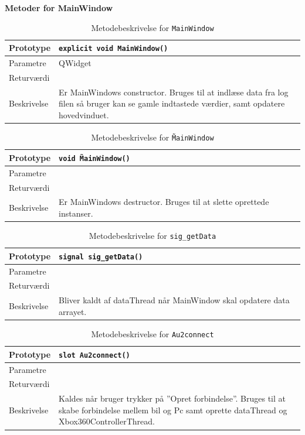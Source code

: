 \textbf{Metoder for MainWindow}

\begin{table}[H]
\begin{tabularx}{\textwidth}{| L{2.5 cm} | Z |} \hline
Prototype & \texttt{explicit void MainWindow()} \\\hline
Parametre &  QWidget \\\hline
Returværdi &  \\\hline
Beskrivelse & Er MainWindows constructor. Bruges til at indlæse data fra log filen så bruger kan se gamle indtastede værdier, samt opdatere hovedvinduet.   \\\hline
\end{tabularx}
\caption{Metodebeskrivelse for \texttt{MainWindow}}
\label{table:met_MainWindow}
\end{table}

\begin{table}[H]
\begin{tabularx}{\textwidth}{| L{2.5 cm} | Z |} \hline
Prototype & \texttt{void \~MainWindow()} \\\hline
Parametre &  \\\hline
Returværdi &  \\\hline
Beskrivelse & Er MainWindows destructor. Bruges til at slette oprettede instanser. \\\hline
\end{tabularx}
\caption{Metodebeskrivelse for \texttt{\~MainWindow}}
\label{table:met_sMainWindow}
\end{table}

\begin{table}[H]
\begin{tabularx}{\textwidth}{| L{2.5 cm} | Z |} \hline
Prototype & \texttt{signal sig\_getData()} \\\hline
Parametre &  \\\hline
Returværdi &  \\\hline
Beskrivelse & Bliver kaldt af dataThread når MainWindow skal opdatere data arrayet. \\\hline
\end{tabularx}
\caption{Metodebeskrivelse for \texttt{sig\_getData}}
\label{table:met_siggetData}
\end{table}

\begin{table}[H]
\begin{tabularx}{\textwidth}{| L{2.5 cm} | Z |} \hline
Prototype & \texttt{slot Au2connect()} \\\hline
Parametre &   \\\hline
Returværdi &  \\\hline
Beskrivelse & Kaldes når bruger trykker på ''Opret forbindelse''. Bruges til at skabe forbindelse mellem bil og Pc samt oprette dataThread og Xbox360ControllerThread. \\\hline
\end{tabularx}
\caption{Metodebeskrivelse for \texttt{Au2connect}}
\label{table:met_Au2connect}
\end{table}

